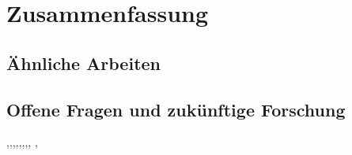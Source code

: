 \chapter{Zusammenfassung}

\section{Ähnliche Arbeiten}

\section{Offene Fragen und zukünftige Forschung}
\cite{res},\cite{n-3},\cite{OnDet},\cite{Bounds},\cite{Discrep},\cite{Cartesian},\cite{upper},\cite{landmarks}, \cite{Erdos}, \cite{botmapdoag}


